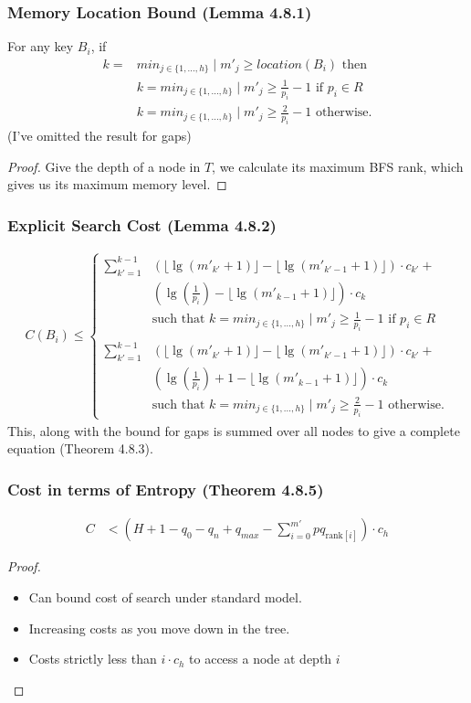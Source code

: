 \documentclass{beamer}
\theoremstyle{plain}
\begin{document}
\begin{frame}\frametitle{Memory Location Bound (Lemma 4.8.1)}
For any key $B_i$, if
\begin{align*}
k=&min_{j \in \{1, ..., h\}} \mid m'_j \geq location(B_i) \text{ then} \\
&k=min_{j \in \{1, ..., h\}} \mid m'_j \geq \frac{1}{p_i}-1 \text{ if } p_i \in R \\
&k=min_{j \in \{1, ..., h\}} \mid m'_j \geq \frac{2}{p_i}-1 \text{ otherwise.}
\end{align*}
(I've omitted the result for gaps)
\begin{proof}
Give the depth of a node in $T$, we calculate its maximum BFS rank, which gives us its maximum memory level.
\end{proof}
\end{frame}

\begin{frame}\frametitle{Explicit Search Cost (Lemma 4.8.2)}
\begin{align*} 
C(B_i) \leq 
\begin{cases}
 \sum_{k'=1}^{k-1} &\left(\lfloor \lg(m'_{k'}+1) \rfloor - \lfloor \lg(m'_{k'-1}+1) \rfloor \right)\cdot c_{k'}+ \\
 &\left(\lg(\frac{1}{p_i}) - \lfloor \lg(m'_{k-1}+1) \rfloor \right)\cdot c_k\\
&\text{such that } k=min_{j \in \{1, ..., h\}} \mid m'_j \geq \frac{1}{p_i}-1 \text{ if } p_i \in R \\\\
 \sum_{k'=1}^{k-1} &\left(\lfloor \lg(m'_{k'}+1) \rfloor - \lfloor \lg(m'_{k'-1}+1) \rfloor \right)\cdot c_{k'}+ \\
 &\left(\lg(\frac{1}{p_i}) + 1 - \lfloor \lg(m'_{k-1}+1) \rfloor \right)\cdot c_k\\
&\text{such that } k=min_{j \in \{1, ..., h\}} \mid m'_j \geq \frac{2}{p_i}-1 \text{ otherwise.}  
\end{cases}
\end{align*}
This, along with the bound for gaps is summed over all nodes to give a complete equation (Theorem 4.8.3).
\end{frame}

\begin{frame}\frametitle{Cost in terms of Entropy (Theorem 4.8.5)}
\begin{align*}
C &<  (H + 1 - q_0 - q_n + q_{max} - \sum_{i=0}^{m'} pq_{\text{rank}[i]})\cdot c_h
\end{align*}
\begin{proof}
\begin{itemize}
\item Can bound cost of search under standard model.
\item Increasing costs as you move down in the tree.
\item Costs strictly less than $i \cdot c_h$ to access a node at depth $i$
\end{itemize}
\end{proof}
\end{frame}
\end{document}
